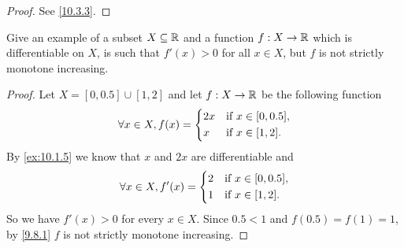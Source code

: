 \begin{proof}
  See \cref{10.3.3}.
\end{proof}

\begin{ex}\label{ex:10.3.5}
  Give an example of a subset \(X \subseteq \mathbb{R}\) and a function \(f : X \to \mathbb{R}\) which is differentiable on \(X\), is such that \(f'(x) > 0\) for all \(x \in X\), but \(f\) is not strictly monotone increasing.
\end{ex}

\begin{proof}
  Let \(X = [0, 0.5] \cup [1, 2]\) and let \(f : X \to \mathbb{R}\) be the following function
  \[
    \forall x \in X, f(x) = \begin{dcases}
      2x & \text{if } x \in [0, 0.5], \\
      x  & \text{if } x \in [1, 2].
    \end{dcases}
  \]
  By \cref{ex:10.1.5} we know that \(x\) and \(2x\) are differentiable and
  \[
    \forall x \in X, f'(x) = \begin{dcases}
      2 & \text{if } x \in [0, 0.5], \\
      1 & \text{if } x \in [1, 2].
    \end{dcases}
  \]
  So we have \(f'(x) > 0\) for every \(x \in X\).
  Since \(0.5 < 1\) and \(f(0.5) = f(1) = 1\), by \cref{9.8.1} \(f\) is not strictly monotone increasing.
\end{proof}